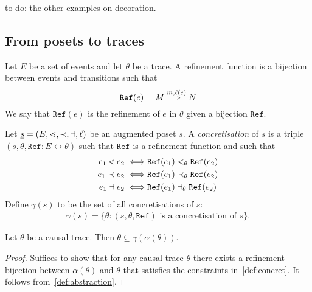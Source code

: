 \begin{mdframed}[backgroundcolor=blue!20]
to do: the other examples on decoration.
\end{mdframed}

\subsection{From posets to traces}

\begin{definition}
  Let $E$ be a set of events and let $\theta$ be a trace. A refinement function is a bijection between events and transitions such that
  \[
  \mathtt{Ref}(e) = M\overset{m,\ell(e)}{\Rightarrow}N
  \]
  We say that $\mathtt{Ref}(e)$ is the refinement of $e$ in $\theta$ given a bijection $\mathtt{Ref}$.
\end{definition}

\begin{definition}
  \label{def:concret}
  Let $\underline s=(E,\lessdot,\prec,\dashv,\ell)$ be an augmented poset $s$.
  A \emph{concretisation} of $s$ is a triple $(s,\theta,\mathtt{Ref}:E\leftrightarrow\theta)$ such that $\mathtt{Ref}$ is a refinement function and such that
  \begin{align*}
    e_1\lessdot e_2 \iff& \mathtt{Ref}(e_1) <_{\theta}\mathtt{Ref}(e_2)\\
    e_1\prec e_2 \iff& \mathtt{Ref}(e_1) \prec_{\theta}\mathtt{Ref}(e_2)\\
    e_1\dashv e_2 \iff& \mathtt{Ref}(e_1) \dashv_{\theta}\mathtt{Ref}(e_2)
  \end{align*}
  Define $\gamma(s)$ to be the set of all concretisations of $s$:
  \begin{align*}
    \gamma(s) = \{\theta: (s,\theta,\mathtt{Ref})\text{ is a concretisation of }s\}.
  \end{align*}
\end{definition}

\begin{theorem}
  Let $\theta$ be a causal trace. Then $\theta\subseteq\gamma(\alpha(\theta))$.
\end{theorem}
\begin{proof}
  Suffices to show that for any causal trace $\theta$ there exists a refinement bijection between $\alpha(\theta)$ and $\theta$ that satisfies the constraints in~\autoref{def:concret}. It follows from~\autoref{def:abstraction}.
\end{proof}

